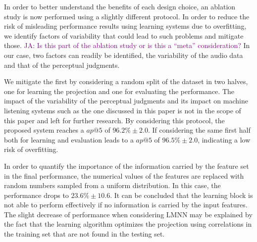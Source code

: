 \documentclass{bmcart}
\newcommand{\ja}[1]{\textcolor{purple}{JA: #1}\xspace}
\begin{document}
In order to better understand the benefits of each design choice, an ablation study is now performed using a slightly different protocol.
In order to reduce the risk of misleading performance results using learning systems due to overfitting, we identify factors of variability that could lead to such problems and mitigate those.
\ja{Is this part of the ablation study or is this a ``meta'' consideration?}
In our case, two factors can readily be identified, the variability of the audio data and that of the perceptual judgments.

We mitigate the first by considering a random split of the dataset in two halves, one for learning the projection and one for evaluating the performance.
The impact of the variability of the perceptual judgments and its impact on machine listening systems such as the one discussed in this paper is not in the scope of this paper and left for further research.
By considering this protocol, the proposed system reaches a $ap@5$ of $96.2\% \pm 2.0$.
If considering the same first half both for learning and evaluation leads to a $ap@5$ of $96.5\% \pm 2.0$, indicating a low risk of overfitting.



In order to quantify the importance of the information carried by the feature set in the final performance, the numerical values of the features are replaced with random numbers sampled from a uniform distribution.
In this case, the performance drops to $23.6\% \pm 10.6$.
It can be concluded that the learning block is not able to perform effectively if no information is carried by the input features.
The slight decrease of performance when considering LMNN may be explained by the fact that the learning algorithm optimizes the projection using correlations in the training set that are not found in the testing set.
\end{document}
